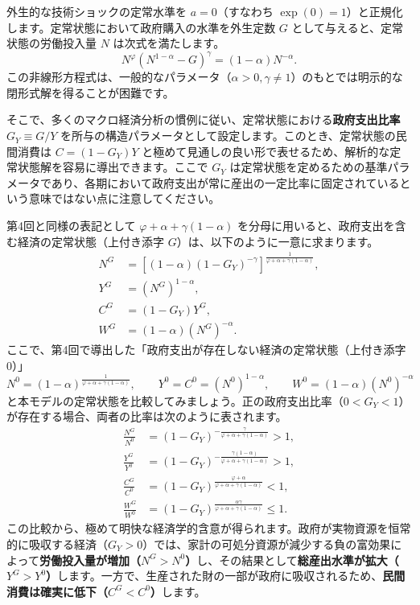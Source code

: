 \documentclass[
  japanese,
  lualatex,
  ja=standard,
  12pt,
  a4paper]{ltjsarticle}
\begin{document}
外生的な技術ショックの定常水準を \(a = 0\)（すなわち
\(\exp(0)=1\)）と正規化します。定常状態において政府購入の水準を外生定数
\(G\) として与えると、定常状態の労働投入量 \(N\) は次式を満たします。 \[
N^\varphi \left( N^{1-\alpha} - G \right)^\gamma = (1-\alpha) N^{-\alpha}.
\]
この非線形方程式は、一般的なパラメータ（\(\alpha > 0, \gamma \neq 1\)）のもとでは明示的な閉形式解を得ることが困難です。

そこで、多くのマクロ経済分析の慣例に従い、定常状態における\textbf{政府支出比率
\(G_Y \equiv G/Y\)}
を所与の構造パラメータとして設定します。このとき、定常状態の民間消費は
\(C = (1-G_Y)Y\)
と極めて見通しの良い形で表せるため、解析的な定常状態解を容易に導出できます。ここで
\(G_Y\)
は定常状態を定めるための基準パラメータであり、各期において政府支出が常に産出の一定比率に固定されているという意味ではない点に注意してください。

第4回と同様の表記として \(\varphi + \alpha + \gamma(1-\alpha)\)
を分母に用いると、政府支出を含む経済の定常状態（上付き添字
\(G\)）は、以下のように一意に求まります。 \[
\begin{aligned}
N^G &= \left[ (1-\alpha) (1-G_Y)^{-\gamma} \right]^{\frac{1}{\varphi + \alpha + \gamma(1-\alpha)}},\\
Y^G &= (N^G)^{1-\alpha},\\
C^G &= (1-G_Y) Y^G,\\
W^G &= (1-\alpha) (N^G)^{-\alpha}.
\end{aligned}
\]
ここで、第4回で導出した「政府支出が存在しない経済の定常状態（上付き添字
\(0\)）」 \[
N^0 = (1-\alpha)^{\frac{1}{\varphi + \alpha + \gamma(1-\alpha)}}, \qquad Y^0 = C^0 = (N^0)^{1-\alpha}, \qquad W^0 = (1-\alpha)(N^0)^{-\alpha}
\]
と本モデルの定常状態を比較してみましょう。正の政府支出比率（\(0 < G_Y < 1\)）が存在する場合、両者の比率は次のように表されます。
\[
\begin{aligned}
\frac{N^G}{N^0} &= (1-G_Y)^{-\frac{\gamma}{\varphi + \alpha + \gamma(1-\alpha)}} > 1,\\
\frac{Y^G}{Y^0} &= (1-G_Y)^{-\frac{\gamma(1-\alpha)}{\varphi + \alpha + \gamma(1-\alpha)}} > 1,\\
\frac{C^G}{C^0} &= (1-G_Y)^{\frac{\varphi + \alpha}{\varphi + \alpha + \gamma(1-\alpha)}} < 1,\\
\frac{W^G}{W^0} &= (1-G_Y)^{\frac{\alpha\gamma}{\varphi + \alpha + \gamma(1-\alpha)}} \leq 1.
\end{aligned}
\]
この比較から、極めて明快な経済学的含意が得られます。政府が実物資源を恒常的に吸収する経済（\(G_Y > 0\)）では、家計の可処分資源が減少する負の富効果によって\textbf{労働投入量が増加（\(N^G > N^0\)）}し、その結果として\textbf{総産出水準が拡大（\(Y^G > Y^0\)）}します。一方で、生産された財の一部が政府に吸収されるため、\textbf{民間消費は確実に低下（\(C^G < C^0\)）}します。
\end{document}
